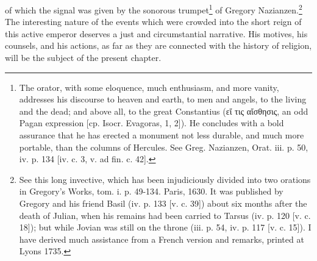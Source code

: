 of which the signal was given by the sonorous trumpet\footnote{The orator, with some eloquence, much enthusiasm, and more vanity, addresses his discourse to heaven and earth, to men and angels, to the living and the dead; and above all, to the great Constantius (\textgreek{ε\texthebrew{ἴ} τις α\texthebrew{ἴ}σθησις}, an odd Pagan expression [cp. Isocr. Evagoras, 1, 2]). He concludes with a bold assurance that he has erected a monument not less durable, and much more portable, than the columns of Hercules. See Greg. Nazianzen, Orat. iii. p. 50, iv. p. 134 [iv. c. 3, v. ad fin. c. 42].} of Gregory Nazianzen.\footnote{See this long invective, which has been injudiciously divided into two orations in Gregory\texthebrew{}’s Works, tom. i. p. 49-134. Paris, 1630. It was published by Gregory and his friend Basil (iv. p. 133 [v. c. 39]) about six months after the death of Julian, when his remains had been carried to Tarsus (iv. p. 120 [v. c. 18]); but while Jovian was still on the throne (iii. p. 54, iv. p. 117 [v. c. 15]). I have derived much assistance from a French version and remarks, printed at Lyons 1735.} The interesting nature of the events which were crowded into the short reign of this active emperor deserves a just and circumstantial narrative. His motives, his counsels, and his actions, as far as they are connected with the history of religion, will be the subject of the present chapter.

